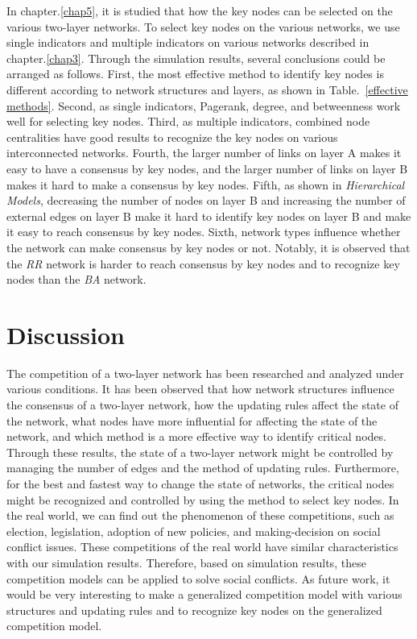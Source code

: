 In chapter.\ref{chap5}, it is studied that how the key nodes can be selected on the various two-layer networks. To select key nodes on the various networks, we use single indicators and multiple indicators on various networks described in chapter.\ref{chap3}. Through the simulation results, several conclusions could be arranged as follows. First, the most effective method to identify key nodes is different according to network structures and layers, as shown in Table.~\ref{effective methods}. Second, as single indicators, Pagerank, degree, and betweenness work well for selecting key nodes. Third, as multiple indicators, combined node centralities have good results to recognize the key nodes on various interconnected networks. Fourth, the larger number of links on layer A makes it easy to have a consensus by key nodes, and the larger number of links on layer B makes it hard to make a consensus by key nodes. Fifth, as shown in \textit{Hierarchical Models}, decreasing the number of nodes on layer B and increasing the number of external edges on layer B make it hard to identify key nodes on layer B and make it easy to reach consensus by key nodes. Sixth, network types influence whether the network can make consensus by key nodes or not. Notably, it is observed that the \textit{RR} network is harder to reach consensus by key nodes and to recognize key nodes than the \textit{BA} network. \\
  
\section{Discussion} 
The competition of a two-layer network has been researched and analyzed under various conditions. It has been observed that how network structures influence the consensus of a two-layer network, how the updating rules affect the state of the network, what nodes have more influential for affecting the state of the network, and which method is a more effective way to identify critical nodes. Through these results, the state of a two-layer network might be controlled by managing the number of edges and the method of updating rules. Furthermore, for the best and fastest way to change the state of networks, the critical nodes might be recognized and controlled by using the method to select key nodes.
In the real world, we can find out the phenomenon of these competitions, such as election, legislation, adoption of new policies, and making-decision on social conflict issues. These competitions of the real world have similar characteristics with our simulation results. Therefore, based on simulation results, these competition models can be applied to solve social conflicts. As future work, it would be very interesting to make a generalized competition model with various structures and updating rules and to recognize key nodes on the generalized competition model.\\   

